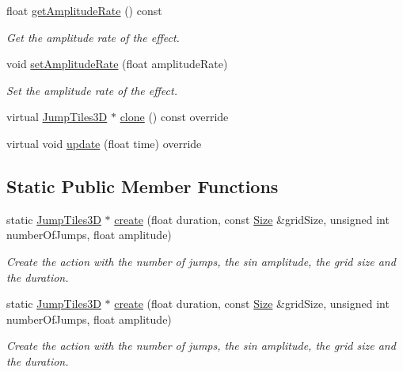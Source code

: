 \begin{DoxyCompactItemize}
float \hyperlink{classJumpTiles3D_aadb1cb0d358f196db393dd09caa1bea5}{get\+Amplitude\+Rate} () const
\begin{DoxyCompactList}\small\item\em Get the amplitude rate of the effect. \end{DoxyCompactList}\item 
void \hyperlink{classJumpTiles3D_a88c71fba09dca459111b8fc0dd03d53f}{set\+Amplitude\+Rate} (float amplitude\+Rate)
\begin{DoxyCompactList}\small\item\em Set the amplitude rate of the effect. \end{DoxyCompactList}\item 
virtual \hyperlink{classJumpTiles3D}{Jump\+Tiles3D} $\ast$ \hyperlink{classJumpTiles3D_a2888c2609ac679b0ba04ade474fa87e6}{clone} () const override
\item 
virtual void \hyperlink{classJumpTiles3D_a4a6f11548391e787667243b8ddaccc6c}{update} (float time) override
\end{DoxyCompactItemize}
\subsection*{Static Public Member Functions}
\begin{DoxyCompactItemize}
\item 
static \hyperlink{classJumpTiles3D}{Jump\+Tiles3D} $\ast$ \hyperlink{classJumpTiles3D_a8d180c58dfa05ba2a67afc6e4a0c96ad}{create} (float duration, const \hyperlink{classSize}{Size} \&grid\+Size, unsigned int number\+Of\+Jumps, float amplitude)
\begin{DoxyCompactList}\small\item\em Create the action with the number of jumps, the sin amplitude, the grid size and the duration. \end{DoxyCompactList}\item 
static \hyperlink{classJumpTiles3D}{Jump\+Tiles3D} $\ast$ \hyperlink{classJumpTiles3D_ae490dcd7347ad3aa7e8b52e0676e03ae}{create} (float duration, const \hyperlink{classSize}{Size} \&grid\+Size, unsigned int number\+Of\+Jumps, float amplitude)
\begin{DoxyCompactList}\small\item\em Create the action with the number of jumps, the sin amplitude, the grid size and the duration. \end{DoxyCompactList}\end{DoxyCompactItemize}

